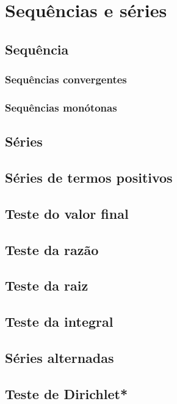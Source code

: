 
\chapter{Sequências e séries}\label{cap:seq_series}

\emconstrucao

\section{Sequência}
\subsection{Sequências convergentes}
\subsection{Sequências monótonas}

\section{Séries}
\section{Séries de termos positivos}
\section{Teste do valor final}
\section{Teste da razão}
\section{Teste da raiz}
\section{Teste da integral}
\section{Séries alternadas}
\section{Teste de Dirichlet*}
